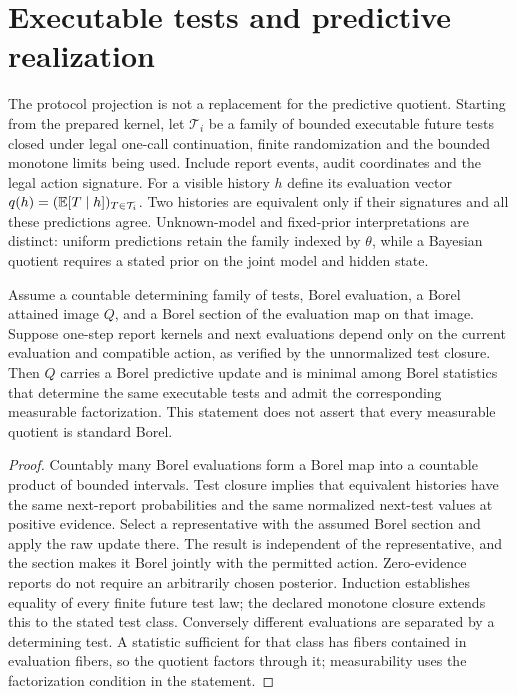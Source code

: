 \section{Executable tests and predictive realization}
\label{sec:quotient}
The protocol projection is not a replacement for the predictive quotient. Starting from the prepared kernel, let $\mathcal T_i$ be a family of bounded executable future tests closed under legal one-call continuation, finite randomization and the bounded monotone limits being used. Include report events, audit coordinates and the legal action signature. For a visible history $h$ define its evaluation vector $q(h)=(\mathbb E[T\mid h])_{T\in\mathcal T_i}$. Two histories are equivalent only if their signatures and all these predictions agree. Unknown-model and fixed-prior interpretations are distinct: uniform predictions retain the family indexed by $\theta$, while a Bayesian quotient requires a stated prior on the joint model and hidden state.

\begin{proposition}\label{prop:quotient}
Assume a countable determining family of tests, Borel evaluation, a Borel attained image $Q$, and a Borel section of the evaluation map on that image. Suppose one-step report kernels and next evaluations depend only on the current evaluation and compatible action, as verified by the unnormalized test closure. Then $Q$ carries a Borel predictive update and is minimal among Borel statistics that determine the same executable tests and admit the corresponding measurable factorization. This statement does not assert that every measurable quotient is standard Borel.
\end{proposition}
\begin{proof}
Countably many Borel evaluations form a Borel map into a countable product of bounded intervals. Test closure implies that equivalent histories have the same next-report probabilities and the same normalized next-test values at positive evidence. Select a representative with the assumed Borel section and apply the raw update there. The result is independent of the representative, and the section makes it Borel jointly with the permitted action. Zero-evidence reports do not require an arbitrarily chosen posterior. Induction establishes equality of every finite future test law; the declared monotone closure extends this to the stated test class. Conversely different evaluations are separated by a determining test. A statistic sufficient for that class has fibers contained in evaluation fibers, so the quotient factors through it; measurability uses the factorization condition in the statement.
\end{proof}

